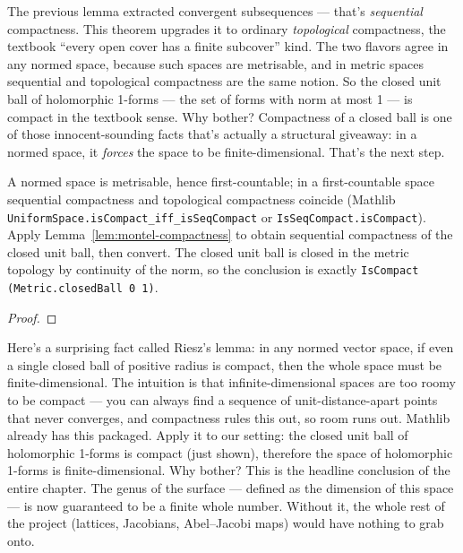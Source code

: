 \begin{layman}
The previous lemma extracted convergent subsequences --- that's
\emph{sequential} compactness. This theorem upgrades it to ordinary
\emph{topological} compactness, the textbook ``every open cover has a
finite subcover'' kind. The two flavors agree in any normed space,
because such spaces are metrisable, and in metric spaces sequential and
topological compactness are the same notion. So the closed unit ball of
holomorphic 1-forms --- the set of forms with norm at most 1 --- is compact in
the textbook sense. Why bother? Compactness of a closed ball is one of
those innocent-sounding facts that's actually a structural giveaway: in
a normed space, it \emph{forces} the space to be finite-dimensional.
That's the next step.
\end{layman}

\begin{proofsketch}
A normed space is metrisable, hence first-countable; in a first-countable
space sequential compactness and topological compactness coincide
(Mathlib \texttt{UniformSpace.isCompact\_iff\_isSeqCompact} or
\texttt{IsSeqCompact.isCompact}). Apply
Lemma~\ref{lem:montel-compactness} to obtain sequential compactness of
the closed unit ball, then convert. The closed unit ball is closed in
the metric topology by continuity of the norm, so the conclusion is
exactly \texttt{IsCompact (Metric.closedBall 0 1)}.
\end{proofsketch}


\begin{proof}\leanok\end{proof}

\begin{layman}
Here's a surprising fact called Riesz's lemma: in any normed vector
space, if even a single closed ball of positive radius is compact, then
the whole space must be finite-dimensional. The intuition is that
infinite-dimensional spaces are too roomy to be compact --- you can always
find a sequence of unit-distance-apart points that never converges, and
compactness rules this out, so room runs out. Mathlib already has this
packaged. Apply it to our setting: the closed unit ball of holomorphic
1-forms is compact (just shown), therefore the space of holomorphic
1-forms is finite-dimensional. Why bother? This is the headline
conclusion of the entire chapter. The genus of the surface --- defined as
the dimension of this space --- is now guaranteed to be a finite whole
number. Without it, the whole rest of the project (lattices, Jacobians,
Abel--Jacobi maps) would have nothing to grab onto.
\end{layman}

